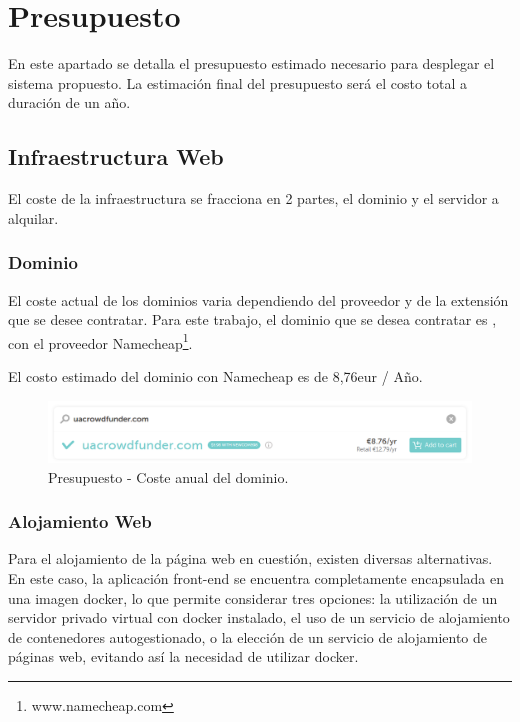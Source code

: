 \section{Presupuesto}

En este apartado se detalla el presupuesto estimado necesario para desplegar el sistema propuesto. La estimación final del presupuesto será el costo total a duración de un año.

\subsection{Infraestructura Web}

El coste de la infraestructura se fracciona en 2 partes, el dominio y el servidor a alquilar.

\subsubsection{Dominio}

El coste actual de los dominios varia dependiendo del proveedor y de la extensión que se desee contratar. Para este trabajo, el dominio que se desea contratar es , con el proveedor Namecheap\footnote{www.namecheap.com}.

\bigskip

El costo estimado del dominio con Namecheap es de 8,76eur / Año.

\begin{figure}[H]
        \centering
        \includegraphics[width=1\textwidth]{img/capturas/dominio.png}
        \caption{Presupuesto - Coste anual del dominio.}
        \label{fig:configApi}
\end{figure}

\newpage

\subsubsection{Alojamiento Web}

Para el alojamiento de la página web en cuestión, existen diversas alternativas. En este caso, la aplicación front-end se encuentra completamente encapsulada en una imagen docker, lo que permite considerar tres opciones: la utilización de un servidor privado virtual con docker instalado, el uso de un servicio de alojamiento de contenedores autogestionado, o la elección de un servicio de alojamiento de páginas web, evitando así la necesidad de utilizar docker. 

